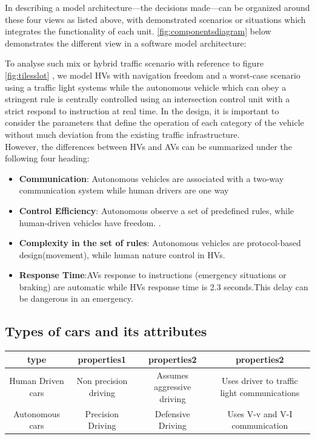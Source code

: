 \documentclass{book}
\begin{document}
In describing a model architecture—the decisions made—can be organized around these four views as listed above, with demonstrated scenarios or situations which integrates the functionality of each unit. \cref{fig:componentsdiagram} below demonstrates the different view in a software model architecture:

To analyse such mix or hybrid traffic scenario with reference to figure \ref{fig:tilesslot} , we  model HVs with navigation freedom and a worst-case scenario using a traffic light systems while the autonomous vehicle which can obey a stringent rule is centrally controlled using an intersection control unit with a strict respond to instruction at real time. In the design,  it is  important to consider the parameters that define the operation of each category of the vehicle without much deviation from the existing traffic infrastructure.\\
However, the differences between  HVs and AVs can be summarized under the following four heading:
\begin{itemize}
\item \textbf{Communication}: Autonomous vehicles are associated with a two-way communication system while human drivers are one way
    \item \textbf{Control Efficiency}: Autonomous observe a set of predefined rules, while human-driven vehicles have freedom. \cite{liu2018safe}.
    \item \textbf{Complexity in the set of rules}: Autonomous vehicles are protocol-based design(movement), while human nature control in HVs.
    \item \textbf{Response Time}:AVs response to instructions (emergency situations or braking) are automatic while HVs response time is 2.3 seconds\cite{mcgehee2000driver}.This delay can be dangerous in an emergency.
\end{itemize}

\subsection{Types of cars and its attributes}


\begin{center}
\begin{tabular}{ |c|c|c|c| }
 \hline
 type & properties1  & properties2 & properties2 \\
  \hline
 Human Driven cars & Non precision driving & Assumes aggressive driving & Uses driver to traffic light communications \\
  \hline
 Autonomous cars & Precision Driving & Defensive Driving & Uses V-v and V-I communication \\
 \hline
\end{tabular}
\end{center}
\end{document}

